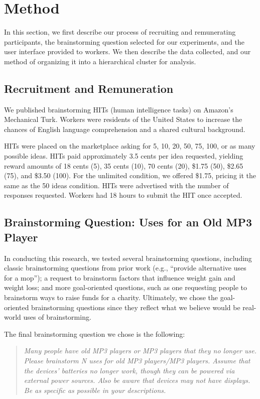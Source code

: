 \section{Method}
In this section, we first describe our process of recruiting and remunerating participants, the brainstorming question selected for our experiments, and the user interface provided to workers. We then describe the data collected, and our method of organizing it into a hierarchical cluster for analysis.

\subsection{Recruitment and Remuneration}
We published brainstorming HITs (human intelligence tasks) on Amazon's Mechanical Turk. Workers were residents of the United States to increase the chances of English language comprehension and a shared cultural background.

HITs were placed on the marketplace asking for 5, 10, 20, 50, 75, 100, or as many possible ideas. HITs paid approximately 3.5 cents per idea requested, yielding reward amounts of 18 cents (5), 35 cents (10), 70 cents (20), \$1.75 (50), \$2.65 (75), and \$3.50 (100). For the unlimited condition, we offered \$1.75, pricing it the same as the 50 ideas condition. HITs were advertised with the number of responses requested. Workers had 18 hours to submit the HIT once accepted.

\subsection{Brainstorming Question: Uses for an Old MP3 Player}
In conducting this research, we tested several brainstorming questions, including classic brainstorming questions from prior work (e.g., ``provide alternative uses for a mop''); a request to brainstorm factors that influence weight gain and weight loss; and more goal-oriented questions, such as one requesting people to brainstorm ways to raise funds for a charity. Ultimately, we chose the goal-oriented brainstorming questions since they reflect what we believe would be real-world uses of brainstorming.

The final brainstorming question we chose is the following:
\begin{quote}
{\em Many people have old MP3 players or MP3 players that they no longer use. Please brainstorm N uses for old MP3 players/MP3 players. Assume that the devices' batteries no longer work, though they can be powered via external power sources. Also be aware that devices may {\em not \/} have displays. Be as specific as possible in your descriptions.\/}
\end{quote}


